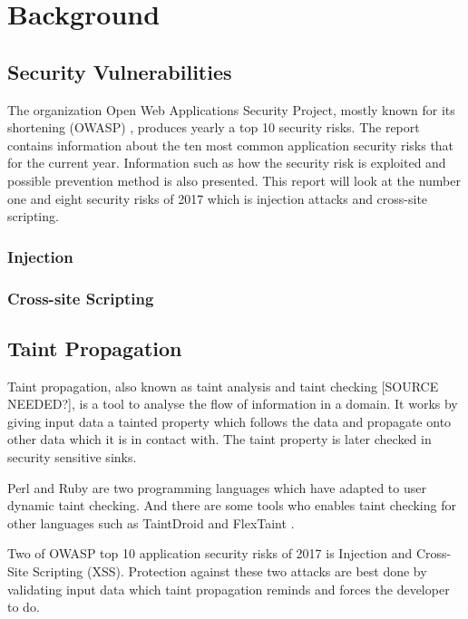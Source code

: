 \chapter{Background}

\section{Security Vulnerabilities}
The organization Open Web Applications Security Project, mostly known for its shortening (OWASP) \parencite{OpenWebApplicationSecurityProject}, produces yearly a top 10 security risks. The report contains information about the ten most common application security risks that for the current year. Information such as how the security risk is exploited and possible prevention method is also presented. \parencite{OWASP2017} This report will look at the number one and eight security risks of 2017 which is injection attacks and cross-site scripting. \parencite{OWASP2017}

\subsection{Injection}


\subsection{Cross-site Scripting}


\section{Taint Propagation}
Taint propagation, also known as taint analysis and taint checking [SOURCE NEEDED?], is a tool to analyse the flow of information in a domain. \parencite{Pan2015} It works by giving input data a tainted property which follows the data and propagate onto other data which it is in contact with. The taint property is later checked in security sensitive sinks. \parencite{Pan2015} 

Perl and Ruby are two programming languages which have adapted to user dynamic taint checking. \parencite{perl, ruby} And there are some tools who enables taint checking for other languages such as TaintDroid \parencite{Ma2010} and FlexTaint \parencite{Venkataramani2008}.

Two of OWASP top 10 application security risks of 2017 is Injection and Cross-Site Scripting (XSS). \parencite{OWASP2017} Protection against these two attacks are best done by validating input data which taint propagation reminds and forces the developer to do.



